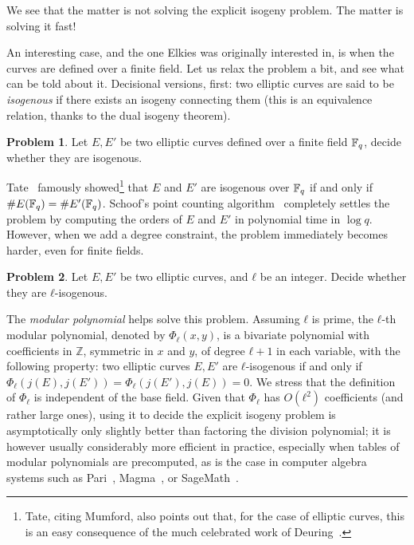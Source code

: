 \documentclass{report}
\theoremstyle{plain}
\theoremstyle{definition}
\newtheorem{problem}{Problem}
\begin{document}
We see that the matter is not solving the explicit isogeny
problem. The matter is solving it fast!

An interesting case, and the one Elkies was originally interested in,
is when the curves are defined over a finite field. %
Let us relax the problem a bit, and see what can be told about it. %
Decisional versions, first: two elliptic curves are said to be
\emph{isogenous} if there exists an isogeny connecting them (this is
an equivalence relation, thanks to the dual isogeny theorem).

\begin{problem}
  \label{prob:isogenous}
  Let $E,E'$ be two elliptic curves defined over a finite field
  $\mathbb{F}_q$, decide whether they are isogenous.
\end{problem}

Tate~\cite[Th.~1(c)]{Tate} famously showed\footnote{Tate, citing
  Mumford, also points out that, for the case of elliptic curves, this
  is an easy consequence of the much celebrated work of
  Deuring~\cite{deuring41}.} that $E$ and $E'$ are isogenous over
$\mathbb{F}_q$ if and only if $\#E(\mathbb{F}_q)=\#E'(\mathbb{F}_q)$. %
Schoof's point counting algorithm~\cite{schoof85,schoof95} completely
settles the problem by computing the orders of $E$ and $E'$ in
polynomial time in $\log q$. %
However, when we add a degree constraint, the problem immediately
becomes harder, even for finite fields. %

\begin{problem}
  \label{prob:ell-isogenous}
  Let $E,E'$ be two elliptic curves, and $ℓ$ be an integer. Decide
  whether they are $ℓ$-isogenous.
\end{problem}

The \emph{modular polynomial} helps solve this problem. %
Assuming $ℓ$ is prime, the $ℓ$-th modular polynomial, denoted by
$Φ_ℓ(x,y)$, is a bivariate polynomial with coefficients in $ℤ$,
symmetric in $x$ and $y$, of degree $ℓ+1$ in each variable, with the
following property: two elliptic curves $E,E'$ are $ℓ$-isogenous if
and only if $Φ_ℓ(j(E),j(E'))=Φ_ℓ(j(E'),j(E))=0$. %
We stress that the definition of $Φ_ℓ$ is independent of the base
field. %
Given that $Φ_ℓ$ has $O(ℓ^2)$ coefficients (and rather large ones),
using it to decide the explicit isogeny problem is asymptotically only
slightly better than factoring the division polynomial; it is however
usually considerably more efficient in practice, especially when
tables of modular polynomials are precomputed, as is the case in
computer algebra systems such as Pari~\cite{Pari}, Magma~\cite{MAGMA},
or SageMath~\cite{Sage}. %
\end{document}
